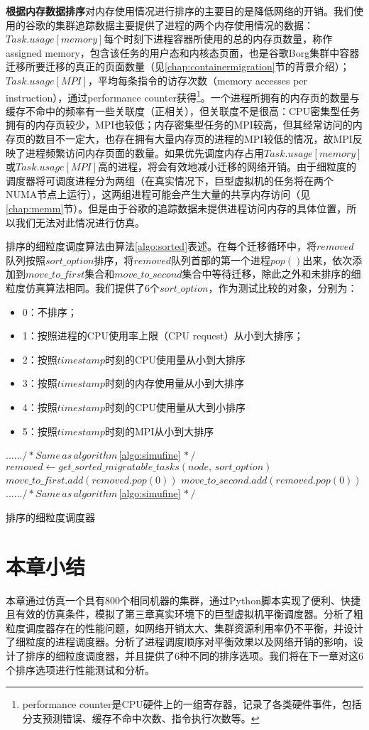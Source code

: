 \noindent\textbf{根据内存数据排序}\quad 对内存使用情况进行排序的主要目的是降低网络的开销。我们使用的谷歌的集群追踪数据主要提供了进程的两个内存使用情况的数据：$Task.usage[memory]$每个时刻下进程容器所使用的总的内存页数量，称作assigned memory，包含该任务的用户态和内核态页面，也是谷歌Borg集群中容器迁移所要迁移的真正的页面数量（见\ref{chap:containermigration}节的背景介绍）；$Task.usage[MPI]$，平均每条指令的访存次数（memory accesses per instruction），通过performance counter获得\footnote{performance counter\cite{perf}是CPU硬件上的一组寄存器，记录了各类硬件事件，包括分支预测错误、缓存不命中次数、指令执行次数等。}。一个进程所拥有的内存页的数量与缓存不命中的频率有一些关联度（正相关），但关联度不是很高：CPU密集型任务拥有的内存页较少，MPI也较低；内存密集型任务的MPI较高，但其经常访问的内存页的数目不一定大，也存在拥有大量内存页的进程的MPI较低的情况，故MPI反映了进程频繁访问内存页面的数量。如果优先调度内存占用$Task.usage[memory]$或$Task.usage[MPI]$高的进程，将会有效地减小迁移的网络开销。由于细粒度的调度器将可调度进程分为两组（在真实情况下，巨型虚拟机的任务将在两个NUMA节点上运行），这两组进程可能会产生大量的共享内存访问（见\ref{chap:memm}节）。但是由于谷歌的追踪数据未提供进程访问内存的具体位置，所以我们无法对此情况进行仿真。

排序的细粒度调度算法由算法\ref{algo:sorted}表述。在每个迁移循环中，将$removed$队列按照$sort\_option$排序，将$removed$队列首部的第一个进程$pop()$出来，依次添加到$move\_to\_first$集合和$move\_to\_second$集合中等待迁移，除此之外和未排序的细粒度仿真算法相同。我们提供了6个$sort\_option$，作为测试比较的对象，分别为：

\begin{itemize}
  \item 0：不排序；
  \item 1：按照进程的CPU使用率上限（CPU request）从小到大排序；
  \item 2：按照$timestamp$时刻的CPU使用量从小到大排序
  \item 3：按照$timestamp$时刻的内存使用量从小到大排序
  \item 4：按照$timestamp$时刻的CPU使用量从大到小排序
  \item 5：按照$timestamp$时刻的MPI从小到大排序
\end{itemize}

\begin{algorithm}[h]
\begin{algorithmic}[1]
\State $...... /* Same \,as\, algorithm\,$\ref{algo:simufine}$\,*/$
\State $removed \gets get\_sorted\_migratable\_tasks(node,\,sort\_option)$
\State $move\_to\_first.add(removed.pop(0))$
\EndWhile
{}
\State $move\_to\_second.add(removed.pop(0))$
\EndWhile
\State $...... /* Same \,as\, algorithm\,$\ref{algo:simufine}$\,*/$
\end{algorithmic}
\caption{排序的细粒度调度器}
\label{algo:sorted}
\end{algorithm}

\section{本章小结}
本章通过仿真一个具有800个相同机器的集群，通过Python脚本实现了便利、快捷且有效的仿真条件，模拟了第三章真实环境下的巨型虚拟机平衡调度器。分析了粗粒度调度器存在的性能问题，如网络开销太大、集群资源利用率仍不平衡，并设计了细粒度的进程调度器。分析了进程调度顺序对平衡效果以及网络开销的影响，设计了排序的细粒度调度器，并且提供了6种不同的排序选项。我们将在下一章对这6个排序选项进行性能测试和分析。